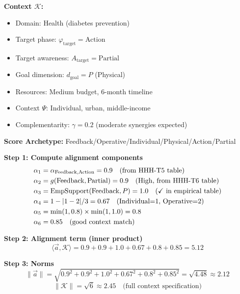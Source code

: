 \begin{tcolorbox}[colback=yellow!5!white, colframe=yellow!75!black,
    title=\textbf{Worked Example: Inner Product Score Calculation}]

\textbf{Context $\mathcal{K}$:}
\begin{itemize}[nosep]
    \item Domain: Health (diabetes prevention)
    \item Target phase: $\varphi_{\text{target}} = \text{Action}$
    \item Target awareness: $A_{\text{target}} = \text{Partial}$
    \item Goal dimension: $d_{\text{goal}} = P$ (Physical)
    \item Resources: Medium budget, 6-month timeline
    \item Context $\Psi$: Individual, urban, middle-income
    \item Complementarity: $\gamma = 0.2$ (moderate synergies expected)
\end{itemize}

\textbf{Score Archetype:} Feedback/Operative/Individual/Physical/Action/Partial

\medskip
\textbf{Step 1: Compute alignment components}
\begin{align*}
\alpha_1 &= \alpha_{\text{Feedback}, \text{Action}} = 0.9 \quad \text{(from HHH-T5 table)} \\
\alpha_2 &= g(\text{Feedback}, \text{Partial}) = 0.9 \quad \text{(High, from HHH-T6 table)} \\
\alpha_3 &= \text{EmpSupport}(\text{Feedback}, P) = 1.0 \quad \text{(\checkmark\ in empirical table)} \\
\alpha_4 &= 1 - |1 - 2|/3 = 0.67 \quad \text{(Individual=1, Operative=2)} \\
\alpha_5 &= \min(1, 0.8) \times \min(1, 1.0) = 0.8 \\
\alpha_6 &= 0.85 \quad \text{(good context match)}
\end{align*}

\textbf{Step 2: Alignment term (inner product)}
\begin{equation*}
\langle \vec{a}, \mathcal{K} \rangle = 0.9 + 0.9 + 1.0 + 0.67 + 0.8 + 0.85 = \mathbf{5.12}
\end{equation*}

\textbf{Step 3: Norms}
\begin{equation*}
\|\vec{a}\| = \sqrt{0.9^2 + 0.9^2 + 1.0^2 + 0.67^2 + 0.8^2 + 0.85^2} = \sqrt{4.48} \approx 2.12
\end{equation*}
\begin{equation*}
\|\mathcal{K}\| = \sqrt{6} \approx 2.45 \quad \text{(full context specification)}
\end{equation*}


\end{tcolorbox}
